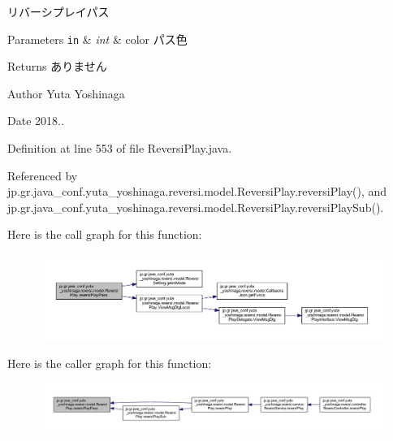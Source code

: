 リバーシプレイパス 


\begin{DoxyParams}[1]{Parameters}
\mbox{\tt in}  & {\em int} & color パス色 \\
\hline
\end{DoxyParams}
\begin{DoxyReturn}{Returns}
ありません 
\end{DoxyReturn}
\begin{DoxyAuthor}{Author}
Yuta Yoshinaga 
\end{DoxyAuthor}
\begin{DoxyDate}{Date}
2018.. 
\end{DoxyDate}


Definition at line 553 of file Reversi\+Play.\+java.



Referenced by jp.\+gr.\+java\+\_\+conf.\+yuta\+\_\+yoshinaga.\+reversi.\+model.\+Reversi\+Play.\+reversi\+Play(), and jp.\+gr.\+java\+\_\+conf.\+yuta\+\_\+yoshinaga.\+reversi.\+model.\+Reversi\+Play.\+reversi\+Play\+Sub().

Here is the call graph for this function\+:
\nopagebreak
\begin{figure}[H]
\begin{center}
\leavevmode
\includegraphics[width=350pt]{classjp_1_1gr_1_1java__conf_1_1yuta__yoshinaga_1_1reversi_1_1model_1_1_reversi_play_acf3c99fcbff26d65f7b12f99d69ab88d_cgraph}
\end{center}
\end{figure}
Here is the caller graph for this function\+:
\nopagebreak
\begin{figure}[H]
\begin{center}
\leavevmode
\includegraphics[width=350pt]{classjp_1_1gr_1_1java__conf_1_1yuta__yoshinaga_1_1reversi_1_1model_1_1_reversi_play_acf3c99fcbff26d65f7b12f99d69ab88d_icgraph}
\end{center}
\end{figure}
\mbox{\label{classjp_1_1gr_1_1java__conf_1_1yuta__yoshinaga_1_1reversi_1_1model_1_1_reversi_play_a6ea2a343ad2fb3ef1317570e87c3fc4f}} 
